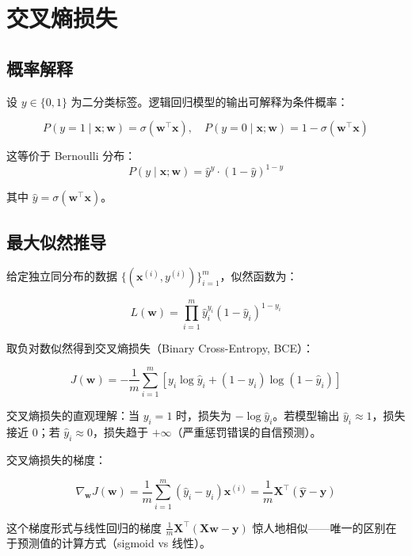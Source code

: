 \section{交叉熵损失}

\subsection{概率解释}

设 $y\in\{0,1\}$ 为二分类标签。逻辑回归模型的输出可解释为条件概率：

\[
P(y=1\mid\mathbf{x};\mathbf{w}) = \sigma(\mathbf{w}^{\top}\mathbf{x}), \quad
P(y=0\mid\mathbf{x};\mathbf{w}) = 1 - \sigma(\mathbf{w}^{\top}\mathbf{x})
\]

这等价于 Bernoulli 分布：
\[
P(y\mid\mathbf{x};\mathbf{w}) = \hat{y}^y \cdot (1-\hat{y})^{1-y}
\]

其中 $\hat{y} = \sigma(\mathbf{w}^{\top}\mathbf{x})$。

\subsection{最大似然推导}

给定独立同分布的数据 $\{(\mathbf{x}^{(i)}, y^{(i)})\}_{i=1}^{m}$，似然函数为：

\[
L(\mathbf{w}) = \prod_{i=1}^{m} \hat{y}_i^{y_i} (1-\hat{y}_i)^{1-y_i}
\]

取负对数似然得到交叉熵损失（Binary Cross-Entropy, BCE）：

\[
J(\mathbf{w}) = -\frac{1}{m}\sum_{i=1}^{m} \left[y_i\log\hat{y}_i + (1-y_i)\log(1-\hat{y}_i)\right]
\]

交叉熵损失的直观理解：当 $y_i=1$ 时，损失为 $-\log\hat{y}_i$。若模型输出 $\hat{y}_i\approx 1$，损失接近 $0$；若 $\hat{y}_i\approx 0$，损失趋于 $+\infty$（严重惩罚错误的自信预测）。

交叉熵损失的梯度：

\[
\nabla_{\mathbf{w}} J(\mathbf{w}) = \frac{1}{m}\sum_{i=1}^{m} (\hat{y}_i - y_i)\mathbf{x}^{(i)}
= \frac{1}{m}\mathbf{X}^{\top}(\hat{\mathbf{y}} - \mathbf{y})
\]

这个梯度形式与线性回归的梯度 $\frac{1}{m}\mathbf{X}^{\top}(\mathbf{X}\mathbf{w} - \mathbf{y})$ 惊人地相似——唯一的区别在于预测值的计算方式（sigmoid vs 线性）。

